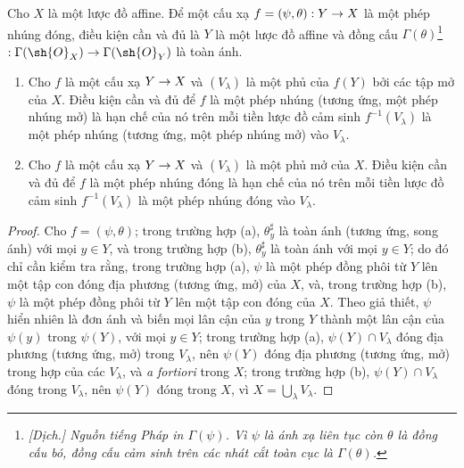 \documentclass[oneside]{amsart}
\makeatletter
\newcommand{\ega@arrow}[2]{\mathchoice{#1}{#2}{#2}{#2}}
\renewcommand{\to}{\ega@arrow{\longrightarrow}{\rightarrow}}
\newcommand{\oldpage}[2][]{{\marginnote{\normalfont\textbf{#1}~|~#2}}\ignorespaces}
\let\EGAOriginalLabel\label
\renewcommand{\label}[1]{\phantomsection\EGAOriginalLabel{#1}}
\makeatother
\begin{document}
\begin{corollary}[4.2.3]
\label{I.4.2.3}
Cho $X$ là một lược đồ affine.
Để một cấu xạ $f=(\psi,\theta):Y\to X$ là một phép nhúng đóng, điều kiện cần và đủ là $Y$ là một lược đồ affine và đồng cấu $\Gamma(\theta)$\footnote{\emph{[Dịch.] Nguồn tiếng Pháp in $\Gamma(\psi)$. Vì $\psi$ là ánh xạ liên tục còn $\theta$ là đồng cấu bó, đồng cấu cảm sinh trên các nhát cắt toàn cục là $\Gamma(\theta)$.}}$:\Gamma(\sh{O}_X)\to\Gamma(\sh{O}_Y)$ là toàn ánh.
\end{corollary}

\begin{corollary}[4.2.4]
\label{I.4.2.4}
\medskip\noindent
\begin{enumerate}
  \item[{\rm(a)}] Cho $f$ là một cấu xạ $Y\to X$ và $(V_\lambda)$ là một phủ của $f(Y)$ bởi các tập mở của $X$.
    Điều kiện cần và đủ để $f$ là một phép nhúng (tương ứng, một phép nhúng mở) là
\oldpage[I]{124}
    hạn chế của nó trên mỗi tiền lược đồ cảm sinh $f^{-1}(V_\lambda)$ là một phép nhúng (tương ứng, một phép nhúng mở) vào $V_\lambda$.
  \item[{\rm(b)}] Cho $f$ là một cấu xạ $Y\to X$ và $(V_\lambda)$ là một phủ mở của $X$.
    Điều kiện cần và đủ để $f$ là một phép nhúng đóng là hạn chế của nó trên mỗi tiền lược đồ cảm sinh $f^{-1}(V_\lambda)$ là một phép nhúng đóng vào $V_\lambda$.
\end{enumerate}
\end{corollary}

\begin{proof}
Cho $f=(\psi,\theta)$;
trong trường hợp (a), $\theta_y^\sharp$ là toàn ánh (tương ứng, song ánh) với mọi $y\in Y$, và trong trường hợp (b), $\theta_y^\sharp$ là toàn ánh với mọi $y\in Y$;
do đó chỉ cần kiểm tra rằng, trong trường hợp (a), $\psi$ là một phép đồng phôi từ $Y$ lên một tập con đóng địa phương (tương ứng, mở) của $X$, và, trong trường hợp (b), $\psi$ là một phép đồng phôi từ $Y$ lên một tập con đóng của $X$.
Theo giả thiết, $\psi$ hiển nhiên là đơn ánh và biến mọi lân cận của $y$ trong $Y$ thành một lân cận của $\psi(y)$ trong $\psi(Y)$, với mọi $y\in Y$;
trong trường hợp (a), $\psi(Y)\cap V_\lambda$ đóng địa phương (tương ứng, mở) trong $V_\lambda$, nên $\psi(Y)$ đóng địa phương (tương ứng, mở) trong hợp của các $V_\lambda$, và \emph{a fortiori} trong $X$;
trong trường hợp (b), $\psi(Y)\cap V_\lambda$ đóng trong $V_\lambda$, nên $\psi(Y)$ đóng trong $X$, vì $X=\bigcup_\lambda V_\lambda$.
\end{proof}
\end{document}
